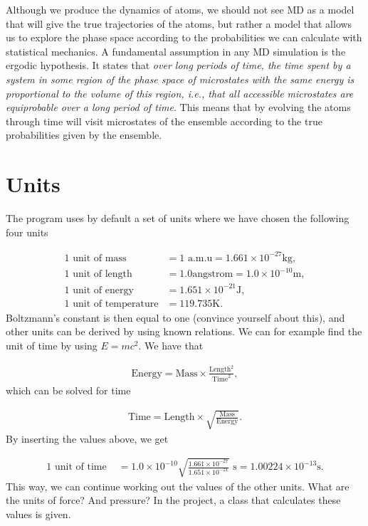 \documentclass[%
oneside,                 %
final,                   %
10pt]{article}
\begin{document}
Although we produce the dynamics of atoms, we should not see MD as a model that will give the true trajectories of the atoms, but rather a model that allows us to explore the phase space according to the probabilities we can calculate with statistical mechanics. A fundamental assumption in any MD simulation is the ergodic hypothesis. It states that \emph{over long periods of time, the time spent by a system in some region of the phase space of microstates with the same energy is proportional to the volume of this region, i.e., that all accessible microstates are equiprobable over a long period of time}. This means that by evolving the atoms through time will visit microstates of the ensemble according to the true probabilities given by the ensemble.

\section{Units}

The program uses by default a set of units where we have chosen the following four units

\begin{align}
	\text{1 unit of mass } &= 1 \text{ a.m.u} = 1.661\times 10^{-27}\mathrm{kg},\\
	\text{1 unit of length } &= 1.0 \mathrm{angstrom} = 1.0\times 10^{-10}\mathrm{m},\\
	\text{1 unit of energy } &= 1.651\times 10^{-21}\mathrm{J},\\
	\text{1 unit of temperature} &= 119.735\mathrm{K}.
\end{align}
Boltzmann's constant is then equal to one (convince yourself about this), and other units can be derived by using known relations. We can for example find the unit of time by using $E=mc^2$. We have that

\begin{align}
	\text{Energy} = \text{Mass} \times \frac{\text{Length}^2}{\text{Time}^2},
\end{align}
which can be solved for time

\begin{align}
	\text{Time} = \text{Length} \times \sqrt{\frac{\text{Mass}}{\text{Energy}}}.
\end{align}
By inserting the values above, we get

\begin{align}
	\text{1 unit of time } &= 1.0 \times 10^{-10}\sqrt{\frac{1.661\times 10^{-27}}{1.651\times 10^{-21}}} \text{ s} = 1.00224\times 10^{-13}\mathrm{s}.
\end{align}
This way, we can continue working out the values of the other units. What are the units of force? And pressure? In the project, a class that calculates these values is given.
\end{document}
